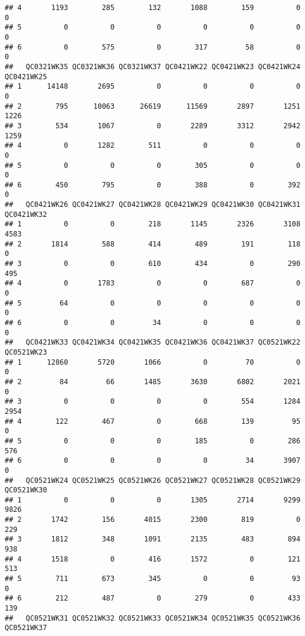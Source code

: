 \documentclass[
]{article}
\begin{document}
\begin{verbatim}
## 4       1193        285        132       1088        159          0          0
## 5          0          0          0          0          0          0          0
## 6          0        575          0        317         58          0          0
##   QC0321WK35 QC0321WK36 QC0321WK37 QC0421WK22 QC0421WK23 QC0421WK24 QC0421WK25
## 1      14148       2695          0          0          0          0          0
## 2        795      10063      26619      11569       2897       1251       1226
## 3        534       1067          0       2289       3312       2942       1259
## 4          0       1282        511          0          0          0          0
## 5          0          0          0        305          0          0          0
## 6        450        795          0        388          0        392          0
##   QC0421WK26 QC0421WK27 QC0421WK28 QC0421WK29 QC0421WK30 QC0421WK31 QC0421WK32
## 1          0          0        218       1145       2326       3108       4583
## 2       1814        588        414        489        191        118          0
## 3          0          0        610        434          0        290        495
## 4          0       1783          0          0        687          0          0
## 5         64          0          0          0          0          0          0
## 6          0          0         34          0          0          0          0
##   QC0421WK33 QC0421WK34 QC0421WK35 QC0421WK36 QC0421WK37 QC0521WK22 QC0521WK23
## 1      12860       5720       1066          0         70          0          0
## 2         84         66       1485       3630       6802       2021          0
## 3          0          0          0          0        554       1284       2954
## 4        122        467          0        668        139         95          0
## 5          0          0          0        185          0        286        576
## 6          0          0          0          0         34       3907          0
##   QC0521WK24 QC0521WK25 QC0521WK26 QC0521WK27 QC0521WK28 QC0521WK29 QC0521WK30
## 1          0          0          0       1305       2714       9299       9826
## 2       1742        156       4015       2300        819          0        229
## 3       1812        348       1091       2135        483        894        938
## 4       1518          0        416       1572          0        121        513
## 5        711        673        345          0          0         93          0
## 6        212        487          0        279          0        433        139
##   QC0521WK31 QC0521WK32 QC0521WK33 QC0521WK34 QC0521WK35 QC0521WK36 QC0521WK37

\end{verbatim}
\end{document}
